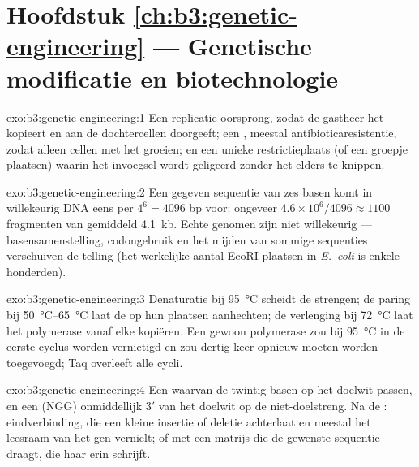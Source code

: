 \section*{Hoofdstuk \ref{ch:b3:genetic-engineering} --- Genetische modificatie en biotechnologie}

\begin{solution}{exo:b3:genetic-engineering:1}
Een replicatie-oorsprong, zodat de gastheer het  kopieert en
aan de dochtercellen doorgeeft; een , meestal
antibioticaresistentie, zodat alleen cellen met het  groeien;
en een unieke restrictieplaats (of een groepje plaatsen) waarin het
invoegsel wordt geligeerd zonder het  elders te knippen.
\end{solution}

\begin{solution}{exo:b3:genetic-engineering:2}
Een gegeven sequentie van zes basen komt in willekeurig DNA eens per
$4^{6} = 4096$ bp voor: ongeveer $4.6\times 10^{6}/4096 \approx 1100$
fragmenten van gemiddeld \qty{4.1}{kb}. Echte genomen zijn niet
willekeurig --- basensamenstelling, codongebruik en het mijden van
sommige sequenties verschuiven de telling (het werkelijke aantal
EcoRI-plaatsen in \emph{E.~coli} is enkele honderden).
\end{solution}

\begin{solution}{exo:b3:genetic-engineering:3}
Denaturatie bij \qty{95}{\celsius} scheidt de strengen; de paring bij
\qtyrange{50}{65}{\celsius} laat de  op hun plaatsen aanhechten;
de verlenging bij \qty{72}{\celsius} laat het polymerase vanaf elke
 kopiëren. Een gewoon polymerase zou bij \qty{95}{\celsius} in de
eerste cyclus worden vernietigd en zou dertig keer opnieuw moeten
worden toegevoegd; Taq overleeft alle cycli.
\end{solution}

\begin{solution}{exo:b3:genetic-engineering:4}
Een  waarvan de twintig basen op het doelwit passen, en een 
(NGG) onmiddellijk 3$'$ van het doelwit op de niet-doelstreng. Na de
: eindverbinding, die een kleine insertie of deletie
achterlaat en meestal het leesraam van het gen vernielt; of  met een matrijs die de gewenste sequentie draagt, die haar
erin schrijft.
\end{solution}

